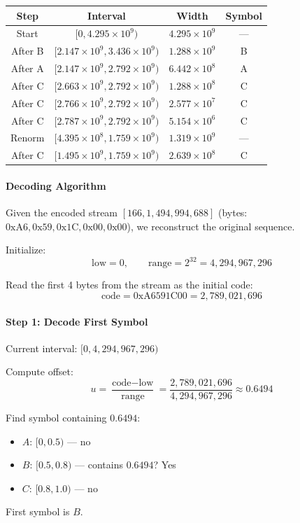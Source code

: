 \begin{center}
\begin{tabular}{c|c|c|c}
\hline
\textbf{Step} & \textbf{Interval} & \textbf{Width} & \textbf{Symbol} \\ \hline
Start & $[0, 4.295\times10^9)$ & $4.295\times10^9$ & — \\
After B & $[2.147\times10^9, 3.436\times10^9)$ & $1.288\times10^9$ & B \\
After A & $[2.147\times10^9, 2.792\times10^9)$ & $6.442\times10^8$ & A \\
After C & $[2.663\times10^9, 2.792\times10^9)$ & $1.288\times10^8$ & C \\
After C & $[2.766\times10^9, 2.792\times10^9)$ & $2.577\times10^7$ & C \\
After C & $[2.787\times10^9, 2.792\times10^9)$ & $5.154\times10^6$ & C \\
Renorm & $[4.395\times10^8, 1.759\times10^9)$ & $1.319\times10^9$ & — \\
After C & $[1.495\times10^9, 1.759\times10^9)$ & $2.639\times10^8$ & C \\ \hline
\end{tabular}
\end{center}

\newpage

\paragraph{Decoding Algorithm}

Given the encoded stream $[166, 1{,}494{,}994{,}688]$ (bytes: $\text{0xA6}, \text{0x59}, \text{0x1C}, \text{0x00}, \text{0x00}$), we reconstruct the original sequence.

Initialize:
\[
\text{low} = 0,\qquad \text{range} = 2^{32} = 4{,}294{,}967{,}296
\]

Read the first 4 bytes from the stream as the initial code:
\[
\text{code} = 0\text{xA6591C00} = 2{,}789{,}021{,}696
\]

\paragraph{Step 1: Decode First Symbol}

Current interval: $[0, 4{,}294{,}967{,}296)$

Compute offset:
\[
u = \frac{\text{code} - \text{low}}{\text{range}} = \frac{2{,}789{,}021{,}696}{4{,}294{,}967{,}296} \approx 0.6494
\]

Find symbol containing $0.6494$:
\begin{itemize}
    \item $A$: $[0, 0.5)$ — no
    \item $B$: $[0.5, 0.8)$ — contains $0.6494$? Yes
    \item $C$: $[0.8, 1.0)$ — no
\end{itemize}
First symbol is $B$.

